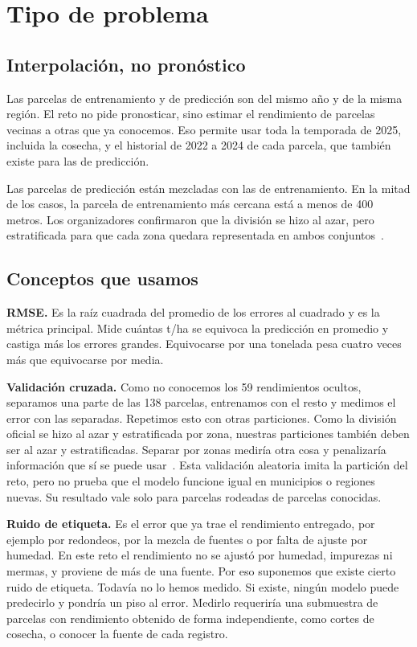 \section{Tipo de problema}\label{sec:problema}

\subsection{Interpolación, no pronóstico}
Las parcelas de entrenamiento y de predicción son del mismo año y de la misma región. El reto no pide pronosticar,
sino estimar el rendimiento de parcelas vecinas a otras que ya conocemos. Eso permite usar toda la temporada de 2025,
incluida la cosecha, y el historial de 2022 a 2024 de cada parcela, que también existe para las de predicción.

Las parcelas de predicción están mezcladas con las de entrenamiento. En la mitad de los casos, la parcela de
entrenamiento más cercana está a menos de 400 metros. Los organizadores confirmaron que la división se hizo al azar, pero estratificada para que cada zona quedara representada en ambos conjuntos~\cite{preguntas}.

\subsection{Conceptos que usamos}
\textbf{RMSE.} Es la raíz cuadrada del promedio de los errores al cuadrado y es la métrica principal. Mide cuántas t/ha se equivoca la predicción en
promedio y castiga más los errores grandes. Equivocarse por una tonelada pesa cuatro veces más que equivocarse por
media.

\textbf{Validación cruzada.} Como no conocemos los 59 rendimientos ocultos, separamos una parte de las 138 parcelas,
entrenamos con el resto y medimos el error con las separadas. Repetimos esto con otras particiones. Como la división oficial se hizo al azar y estratificada por zona, nuestras particiones también deben ser al azar y estratificadas. Separar por zonas mediría otra cosa y
penalizaría información que sí se puede usar~\cite{wadoux2021}. Esta validación aleatoria imita la partición del reto, pero no prueba que el modelo funcione igual en municipios o regiones nuevas. Su resultado vale solo para parcelas rodeadas de parcelas conocidas.

\textbf{Ruido de etiqueta.} Es el error que ya trae el rendimiento entregado, por ejemplo por redondeos, por la mezcla de fuentes o por falta de ajuste por humedad. En este reto el rendimiento no se ajustó por humedad, impurezas ni mermas, y proviene de más de una fuente. Por eso suponemos que existe cierto ruido de etiqueta. Todavía no lo hemos medido. Si existe, ningún modelo puede predecirlo y pondría un piso al error. Medirlo requeriría una submuestra de parcelas con rendimiento obtenido de forma independiente, como cortes de cosecha, o conocer la fuente de cada registro.

